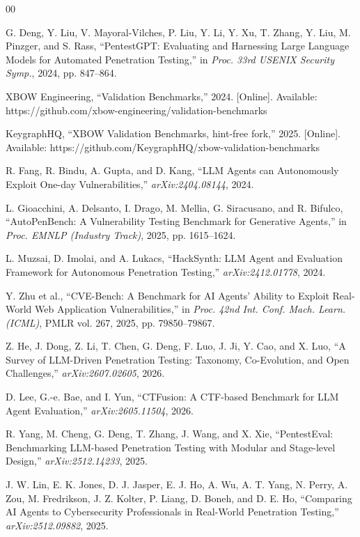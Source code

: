 \documentclass[conference]{IEEEtran}
\begin{document}
\begin{thebibliography}{00}

G. Deng, Y. Liu, V. Mayoral-Vilches, P. Liu, Y. Li, Y. Xu, T. Zhang, Y. Liu, M. Pinzger, and S. Rass, ``PentestGPT: Evaluating and Harnessing Large Language Models for Automated Penetration Testing,'' in \emph{Proc. 33rd USENIX Security Symp.}, 2024, pp. 847--864.

XBOW Engineering, ``Validation Benchmarks,'' 2024. [Online]. Available: https://github.com/xbow-engineering/validation-benchmarks

KeygraphHQ, ``XBOW Validation Benchmarks, hint-free fork,'' 2025. [Online]. Available: https://github.com/KeygraphHQ/xbow-validation-benchmarks

R. Fang, R. Bindu, A. Gupta, and D. Kang, ``LLM Agents can Autonomously Exploit One-day Vulnerabilities,'' \emph{arXiv:2404.08144}, 2024.

L. Gioacchini, A. Delsanto, I. Drago, M. Mellia, G. Siracusano, and R. Bifulco, ``AutoPenBench: A Vulnerability Testing Benchmark for Generative Agents,'' in \emph{Proc. EMNLP (Industry Track)}, 2025, pp. 1615--1624.

L. Muzsai, D. Imolai, and A. Lukacs, ``HackSynth: LLM Agent and Evaluation Framework for Autonomous Penetration Testing,'' \emph{arXiv:2412.01778}, 2024.

Y. Zhu et al., ``CVE-Bench: A Benchmark for AI Agents' Ability to Exploit Real-World Web Application Vulnerabilities,'' in \emph{Proc. 42nd Int. Conf. Mach. Learn. (ICML)}, PMLR vol. 267, 2025, pp. 79850--79867.

Z. He, J. Dong, Z. Li, T. Chen, G. Deng, F. Luo, J. Ji, Y. Cao, and X. Luo, ``A Survey of LLM-Driven Penetration Testing: Taxonomy, Co-Evolution, and Open Challenges,'' \emph{arXiv:2607.02605}, 2026.

D. Lee, G.-e. Bae, and I. Yun, ``CTFusion: A CTF-based Benchmark for LLM Agent Evaluation,'' \emph{arXiv:2605.11504}, 2026.

R. Yang, M. Cheng, G. Deng, T. Zhang, J. Wang, and X. Xie, ``PentestEval: Benchmarking LLM-based Penetration Testing with Modular and Stage-level Design,'' \emph{arXiv:2512.14233}, 2025.

J. W. Lin, E. K. Jones, D. J. Jasper, E. J. Ho, A. Wu, A. T. Yang, N. Perry, A. Zou, M. Fredrikson, J. Z. Kolter, P. Liang, D. Boneh, and D. E. Ho, ``Comparing AI Agents to Cybersecurity Professionals in Real-World Penetration Testing,'' \emph{arXiv:2512.09882}, 2025.


\end{thebibliography}
\end{document}
